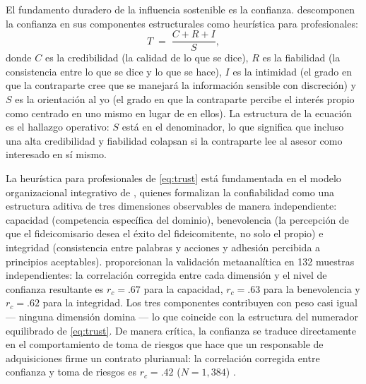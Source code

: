 El fundamento duradero de la influencia sostenible es la confianza. \textcite{maister2000trusted}
descomponen la confianza en sus componentes estructurales como heurística para profesionales:
\begin{equation}\label{eq:trust}
  T \;=\; \frac{C + R + I}{S},
\end{equation}
donde \(C\) es la credibilidad (la calidad de lo que se dice), \(R\) es la fiabilidad (la
consistencia entre lo que se dice y lo que se hace), \(I\) es la intimidad (el grado en que la
contraparte cree que se manejará la información sensible con discreción) y \(S\) es la
orientación al yo (el grado en que la contraparte percibe el interés propio como centrado en
uno mismo en lugar de en ellos). La estructura de la ecuación es el hallazgo operativo:
\(S\) está en el denominador, lo que significa que incluso una alta credibilidad y fiabilidad
colapsan si la contraparte lee al asesor como interesado en sí mismo.

La heurística para profesionales de \cref{eq:trust} está fundamentada en el modelo organizacional
integrativo de \textcite{mayer1995model}, quienes formalizan la confiabilidad como una estructura
aditiva de tres dimensiones observables de manera independiente: capacidad (competencia específica
del dominio), benevolencia (la percepción de que el fideicomisario desea el éxito del fideicomitente,
no solo el propio) e integridad (consistencia entre palabras y acciones y adhesión percibida a
principios aceptables). \textcite{colquitt2007meta} proporcionan la validación metaanalítica en
132 muestras independientes: la correlación corregida entre cada dimensión y el nivel de
confianza resultante es \(r_c = .67\) para la capacidad, \(r_c = .63\) para la benevolencia y
\(r_c = .62\) para la integridad.
Los tres componentes contribuyen con peso casi igual --- ninguna dimensión domina --- lo que
coincide con la estructura del numerador equilibrado de \cref{eq:trust}. De manera crítica, la
confianza se traduce directamente en el comportamiento de toma de riesgos que hace que un
responsable de adquisiciones firme un contrato plurianual: la correlación corregida entre
confianza y toma de riesgos es \(r_c = .42\) (\(N = 1{,}384\))
\parencite{colquitt2007meta}.

